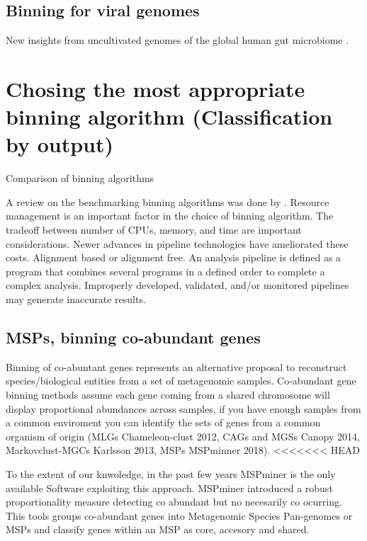 \documentclass{article}
\begin{document}
\subsection*{Binning for viral genomes}
New insights from uncultivated genomes of the global human gut microbiome \cite{nayfach2019new}.

\section*{Chosing the most appropriate binning algorithm (Classification by output)}
\begin{sidewaystable}
\begin{tiny}
\centering
\caption[Comparison of binning algorithms]{Comparison of binning algorithms}
	
\label{Tbinningsoftware}
\end{tiny}
\end{sidewaystable}
A review on the benchmarking binning algorithms was done by .
Resource management is an important factor in the choice of binning algorithm.
The tradeoff between number of \glspl{CPU}, memory, and time are important considerations.
Newer advances in pipeline technologies have ameliorated these costs.
Alignment based or alignment free.
An analysis pipeline is defined as a program that combines several programs in a defined order to complete a complex analysis.
Improperly developed, validated, and/or monitored pipelines may generate inaccurate results.

\subsection*{MSPs, binning co-abundant genes}
Binning of co-abuntant genes represents an alternative proposal to reconstruct species/biological entities from a set of metagenomic samples.
Co-abundant gene binning methods assume each gene coming from a shared chromosome will display proportional abundances across samples, if you have enough samples from a common enviroment you can identify the sets of genes from a common organism of origin (MLGs Chameleon-clust 2012, CAGs and MGSs Canopy 2014, Markovclust-MGCs Karlsson 2013, MSPs MSPminner 2018).
<<<<<<< HEAD

To the extent of our knwoledge, in the past few years MSPminer is the only available Software exploiting this approach. MSPminer introduced a robust proportionality measure detecting co abundant but no necesarily co ocurring. This tools groups co-abundant genes into Metagenomic Species Pan-genomes or MSPs and classify genes within an MSP as core, accesory and shared.  
\end{document}
